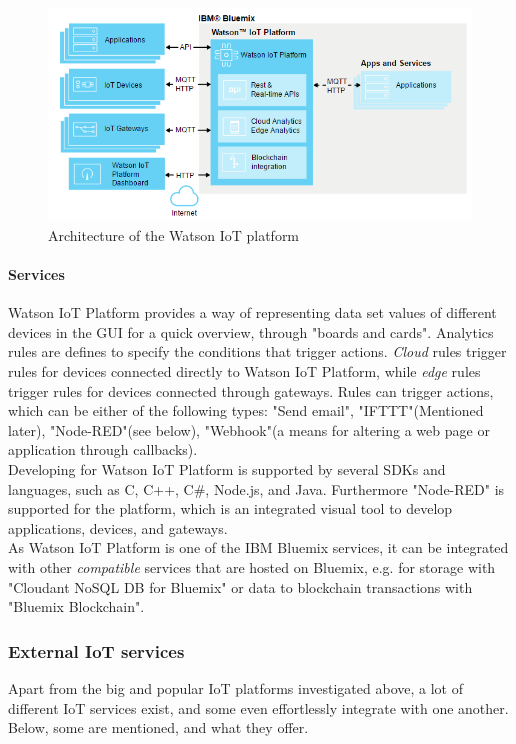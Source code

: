 \begin{figure}[h!]
	\centering
	\includegraphics[width=\textwidth]{figures/ibm/architecture.png}
	\caption{Architecture of the Watson IoT platform}
	\label{fig:ibm:architecture}
\end{figure}

\paragraph{Services}
Watson IoT Platform provides a way of representing data set values of different devices in the GUI for a quick overview, through "boards and cards". Analytics rules are defines to specify the conditions that trigger actions. \textit{Cloud} rules trigger rules for devices connected directly to Watson IoT Platform, while \textit{edge} rules trigger rules for devices connected through gateways. Rules can trigger actions, which can be either of the following types: "Send email", "IFTTT"(Mentioned later), "Node-RED"(see below), "Webhook"(a means for altering a web page or application through callbacks). \\

Developing for Watson IoT Platform is supported by several SDKs and languages, such as C, C++, C\#, Node.js, and Java. Furthermore "Node-RED" is supported for the platform, which is an integrated visual tool to develop applications, devices, and gateways. \\

As Watson IoT Platform is one of the IBM Bluemix services, it can be integrated with other \textit{compatible} services that are hosted on Bluemix, e.g. for storage with "Cloudant NoSQL DB for Bluemix" or data to blockchain transactions with "Bluemix Blockchain"\cite{website:bluemix-blockchain}.

\subsubsection{External IoT services}
Apart from the big and popular IoT platforms investigated above, a lot of different IoT services exist, and some even effortlessly integrate with one another. Below, some are mentioned, and what they offer.
